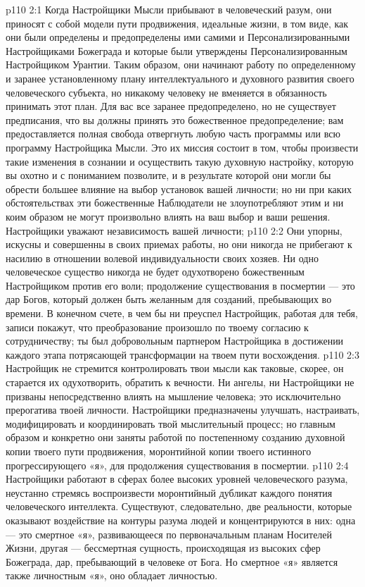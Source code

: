 \vs p110 2:1 Когда Настройщики Мысли прибывают в человеческий разум, они приносят с собой модели пути продвижения, идеальные жизни, в том виде, как они были определены и предопределены ими самими и Персонализированными Настройщиками Божеграда и которые были утверждены Персонализированным Настройщиком Урантии. Таким образом, они начинают работу по определенному и заранее установленному плану интеллектуального и духовного развития своего человеческого субъекта, но никакому человеку не вменяется в обязанность принимать этот план. Для вас все заранее предопределено, но не существует предписания, что вы должны принять это божественное предопределение; вам предоставляется полная свобода отвергнуть любую часть программы или всю программу Настройщика Мысли. Это их миссия состоит в том, чтобы произвести такие изменения в сознании и осуществить такую духовную настройку, которую вы охотно и с пониманием позволите, и в результате которой они могли бы обрести большее влияние на выбор установок вашей личности; но ни при каких обстоятельствах эти божественные Наблюдатели не злоупотребляют этим и ни коим образом не могут произвольно влиять на ваш выбор и ваши решения. Настройщики уважают независимость вашей личности; 
\vs p110 2:2 Они упорны, искусны и совершенны в своих приемах работы, но они никогда не прибегают к насилию в отношении волевой индивидуальности своих хозяев. Ни одно человеческое существо никогда не будет одухотворено божественным Настройщиком против его воли; продолжение существования в посмертии --- это дар Богов, который должен быть желанным для созданий, пребывающих во времени. В конечном счете, в чем бы ни преуспел Настройщик, работая для тебя, записи покажут, что преобразование произошло по твоему согласию к сотрудничеству; ты был добровольным партнером Настройщика в достижении каждого этапа потрясающей трансформации на твоем пути восхождения.
\vs p110 2:3 \pc Настройщик не стремится контролировать твои мысли как таковые, скорее, он старается их одухотворить, обратить к вечности. Ни ангелы, ни Настройщики не призваны непосредственно влиять на мышление человека; это исключительно прерогатива твоей личности. Настройщики предназначены улучшать, настраивать, модифицировать и координировать твой мыслительный процесс; но главным образом и конкретно они заняты работой по постепенному созданию духовной копии твоего пути продвижения, моронтийной копии твоего истинного прогрессирующего «я», для продолжения существования в посмертии.
\vs p110 2:4 Настройщики работают в сферах более высоких уровней человеческого разума, неустанно стремясь воспроизвести моронтийный дубликат каждого понятия человеческого интеллекта. Существуют, следовательно, две реальности, которые оказывают воздействие на контуры разума людей и концентрируются в них: одна --- это смертное «я», развивающееся по первоначальным планам Носителей Жизни, другая --- бессмертная сущность, происходящая из высоких сфер Божеграда, дар, пребывающий в человеке от Бога. Но смертное «я» является также личностным «я», оно обладает личностью.
